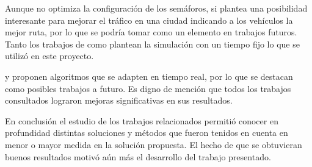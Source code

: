Aunque \citet{Stolfi2012} no optimiza la configuración de los semáforos, si plantea una posibilidad interesante para mejorar el tráfico en una ciudad indicando a los vehículos la mejor ruta, por lo que se podría tomar como un elemento en trabajos futuros. Tanto los trabajos de \citet{Teo2010} como \citet{Stolfi2012} plantean la simulación con un tiempo fijo lo que se utilizó en este proyecto.

\citet{Montana1996} y \citet{Vogel2000}  proponen algoritmos que se adapten en tiempo real, por lo que se destacan como posibles trabajos a futuro.
Es digno de mención que todos los trabajos consultados lograron mejoras significativas en sus resultados.

En conclusión el estudio de los trabajos relacionados permitió conocer en profundidad distintas soluciones y métodos que fueron tenidos en cuenta en menor o mayor medida en la solución propuesta. El hecho de que se obtuvieran buenos resultados motivó aún más el desarrollo del trabajo presentado.





